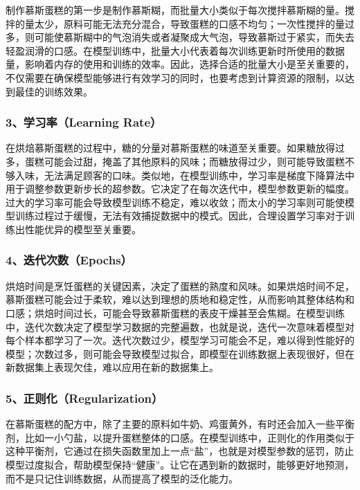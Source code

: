 制作慕斯蛋糕的第一步是制作慕斯糊，而批量大小类似于每次搅拌慕斯糊的量。搅拌的量太少，原料可能无法充分混合，导致蛋糕的口感不均匀；一次性搅拌的量过多，则可能使慕斯糊中的气泡消失或者凝聚成大气泡，导致慕斯过于紧实，而失去轻盈润滑的口感。在模型训练中，批量大小代表着每次训练更新时所使用的数据量，影响着内存的使用和训练的效率。因此，选择合适的批量大小是至关重要的，不仅需要在确保模型能够进行有效学习的同时，也要考虑到计算资源的限制，以达到最佳的训练效果。

\subsubsection{3、学习率（Learning Rate）}

在烘焙慕斯蛋糕的过程中，糖的分量对慕斯蛋糕的味道至关重要。如果糖放得过多，蛋糕可能会过甜，掩盖了其他原料的风味；而糖放得过少，则可能导致蛋糕不够入味，无法满足顾客的口味。类似地，在模型训练中，学习率是梯度下降算法中用于调整参数更新步长的超参数。它决定了在每次迭代中，模型参数更新的幅度。过大的学习率可能会导致模型训练不稳定，难以收敛；而太小的学习率则可能使模型训练过程过于缓慢，无法有效捕捉数据中的模式。因此，合理设置学习率对于训练出性能优异的模型至关重要。

\subsubsection{4、迭代次数（Epochs）}

烘焙时间是烹饪蛋糕的关键因素，决定了蛋糕的熟度和风味。如果烘焙时间不足，慕斯蛋糕可能会过于柔软，难以达到理想的质地和稳定性，从而影响其整体结构和口感；烘焙时间过长，可能会导致慕斯蛋糕的表皮干燥甚至会焦糊。在模型训练中，迭代次数决定了模型学习数据的完整遍数，也就是说，迭代一次意味着模型对每个样本都学习了一次。迭代次数过少，模型学习可能会不足，难以得到性能好的模型；次数过多，则可能会导致模型过拟合，即模型在训练数据上表现很好，但在新数据集上表现欠佳，难以应用在新的数据集上。

\subsubsection{5、正则化（Regularization）}

在慕斯蛋糕的配方中，除了主要的原料如牛奶、鸡蛋黄外，有时还会加入一些平衡剂，比如一小勺盐，以提升蛋糕整体的口感。在模型训练中，正则化的作用类似于这种平衡剂，它通过在损失函数里加上一点“盐”，也就是对模型参数的惩罚，防止模型过度拟合，帮助模型保持“健康”。让它在遇到新的数据时，能够更好地预测，而不是只记住训练数据，从而提高了模型的泛化能力。


